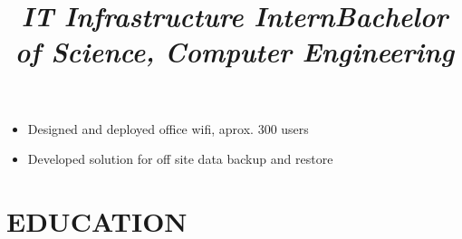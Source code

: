 \documentclass[line, margin]{res}
\begin{document}
\begin{resume}
   \title{\sl IT Infrastructure Intern}
   \begin{position}
                 \begin{itemize}  \itemsep -2pt %
                 \item  Designed and deployed office wifi, aprox. 300 users
                 \item  Developed solution for off site data backup and restore 
                 \end{itemize} 
   \end{position}

\section{EDUCATION}
\title{\sl Bachelor of Science, Computer Engineering}
\begin{position}
                

\end{position}
\end{resume}
\end{document}
